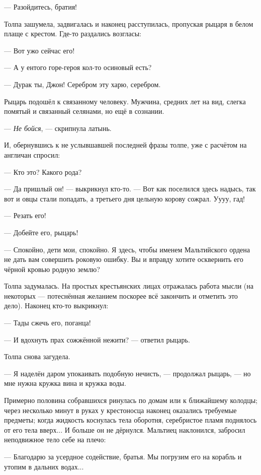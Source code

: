 \begin{achronic}

--- Разойдитесь, братия!

Толпа зашумела, задвигалась и наконец расступилась, пропуская рыцаря в белом плаще с крестом. Где-то раздались возгласы:

--- Вот ужо сейчас его!

--- А у ентого горе-героя кол-то осиновый есть?

--- Дурак ты, Джон! Серебром эту харю, серебром.

Рыцарь подошёл к связанному человеку. Мужчина, средних лет на вид, слегка помятый и связанный селянами, но ещё в сознании.

--- \textit{Не бойся}, --- скрипнула латынь.

И, обернувшись к не услывшавшей последней фразы толпе, уже с расчётом на англичан спросил:

--- Кто это? Какого рода?

--- Да пришлый он! --- выкрикнул кто-то. --- Вот как поселился здесь надысь, так вот и овцы стали попадать,
а третьего дня цельную корову сожрал. Уууу, гад!

--- Резать его!

--- Добейте его, рыцарь!

--- Спокойно, дети мои, спокойно. Я здесь, чтобы именем Мальтийского ордена не дать вам совершить роковую ошибку.
Вы и вправду хотите осквернить его чёрной кровью родную землю?

Толпа задумалась. На простых крестьянских лицах отражалась работа мысли
(на некоторых --- потеснённая желанием поскорее всё закончить и отметить это дело). Наконец кто-то выкрикнул:

--- Тады сжечь его, поганца!

--- И вдохнуть прах сожжённой нежити? --- ответил рыцарь.

Толпа снова загудела.

--- Я наделён даром упокаивать подобную нечисть, --- продолжал рыцарь, --- но мне нужна кружка вина и кружка воды.

Примерно половина собравшихся ринулась по домам или к ближайшему колодцы;
через несколько минут в руках у крестоносца наконец оказались требуемые предметы;
когда жидкость коснулась тела оборотня, серебристое пламя поднялось от его тела вверх... И больше он не дёрнулся.
Мальтиец наклонился, забросил неподвижное тело себе на плечо:

--- Благодарю за усердное содействие, братья. Мы погрузим его на корабль и утопим в дальних водах...


\end{achronic}
